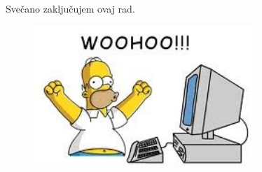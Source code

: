 \documentclass[../diplomski_rad.tex]{subfiles}
\begin{document}
\sloppy

\justifying

Svečano zaključujem ovaj rad.

\begin{figure}[htb]
    \centering
    \includegraphics[width=0.75\textwidth]{Figures/woohoo.png} 
    \label{slk:drugaslika}
\end{figure}
\end{document}
